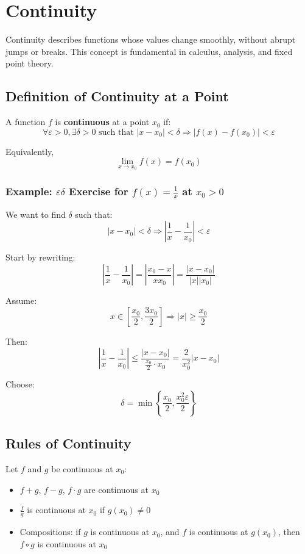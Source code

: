 \section{Continuity}

Continuity describes functions whose values change smoothly, without abrupt jumps or breaks. This concept is fundamental in calculus, analysis, and fixed point theory.

\subsection{Definition of Continuity at a Point}

A function \(f\) is \textbf{continuous} at a point \(x_0\) if:
\[
\forall \varepsilon > 0, \exists \delta > 0 \text{ such that } |x - x_0| < \delta \Rightarrow |f(x) - f(x_0)| < \varepsilon
\]

Equivalently,
\[
\lim_{x \to x_0} f(x) = f(x_0)
\]

\subsubsection*{Example: \(\varepsilon \delta\) Exercise for \(f(x) = \frac{1}{x}\) at \(x_0 > 0\)}

We want to find \(\delta\) such that:
\[
|x - x_0| < \delta \Rightarrow \left|\frac{1}{x} - \frac{1}{x_0}\right| < \varepsilon
\]

Start by rewriting:
\[
\left|\frac{1}{x} - \frac{1}{x_0}\right| = \left|\frac{x_0 - x}{xx_0}\right| = \frac{|x - x_0|}{|x||x_0|}
\]

Assume:
\[
x \in \left[\frac{x_0}{2}, \frac{3x_0}{2}\right] \Rightarrow |x| \ge \frac{x_0}{2}
\]

Then:
\[
\left|\frac{1}{x} - \frac{1}{x_0}\right| \le \frac{|x - x_0|}{\frac{x_0}{2} \cdot x_0} = \frac{2}{x_0^2} |x - x_0|
\]

Choose:
\[
\delta = \min\left\{\frac{x_0}{2}, \frac{x_0^2 \varepsilon}{2} \right\}
\]

\subsection{Rules of Continuity}

Let \(f\) and \(g\) be continuous at \(x_0\):

\begin{itemize}[label=\(-\)]
\item \(f + g\), \(f - g\), \(f \cdot g\) are continuous at \(x_0\)
\item \(\frac{f}{g}\) is continuous at \(x_0\) if \(g(x_0) \ne 0\)
\item Compositions: if \(g\) is continuous at \(x_0\), and \(f\) is continuous at \(g(x_0)\), then \(f \circ g\) is continuous at \(x_0\)
\end{itemize}

